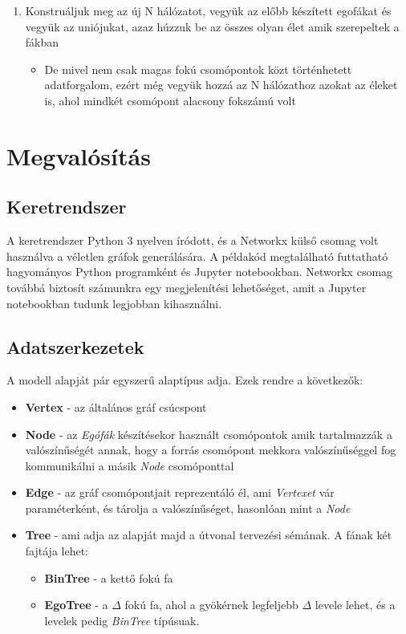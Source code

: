\documentclass[12pt]{report}
\begin{document}
\begin{enumerate}
\begin{itemize}
	\end{itemize}
	\item Konstruáljuk meg az új N hálózatot, vegyük az előbb készített egofákat és vegyük az uniójukat, azaz húzzuk be az összes olyan élet amik szerepeltek a fákban
	\begin{itemize}
		\item     De mivel nem csak magas fokú csomópontok közt történhetett adatforgalom, ezért még vegyük hozzá az N hálózathoz azokat az éleket is, ahol mindkét csomópont alacsony fokszámú volt
	\end{itemize}
\end{enumerate}

\chapter{Megvalósítás}

\section{Keretrendszer}

A keretrendszer Python 3 nyelven íródott, és a Networkx külső csomag volt használva a véletlen gráfok generálására.
A példakód megtalálható futtatható hagyományos Python programként és Jupyter notebookban.  
Networkx csomag továbbá biztosít számunkra egy megjelenítési lehetőséget, amit a Jupyter notebookban tudunk legjobban kihasználni.



\section{Adatszerkezetek}

A modell alapját pár egyszerű alaptípus adja. Ezek rendre a következők:
\begin{itemize}
	\item \textbf{Vertex} - az általános gráf csúcspont
	\item \textbf{Node} - az \textit{Egófák} készítésekor használt csomópontok amik tartalmazzák a valószínűségét annak, hogy a forrás csomópont mekkora valószínűséggel fog kommunikálni a másik \textit{Node} csomóponttal
	\item \textbf{Edge} - az gráf csomópontjait reprezentáló él, ami \textit{Vertexet} vár paraméterként, és tárolja a valószínűséget, hasonlóan mint a \textit{Node}
	\item \textbf{Tree} - ami adja az alapját majd a útvonal tervezési sémának. A fának két fajtája lehet:
	\begin{itemize}
		\item \textbf{BinTree} - a kettő fokú fa
		\item \textbf{EgoTree} - a $\Delta$ fokú fa, ahol a gyökérnek legfeljebb $\Delta$ levele lehet, és a levelek pedig \textit{BinTree} típúsuak.
	\end{itemize}
	
\end{itemize}
	
\end{document}

